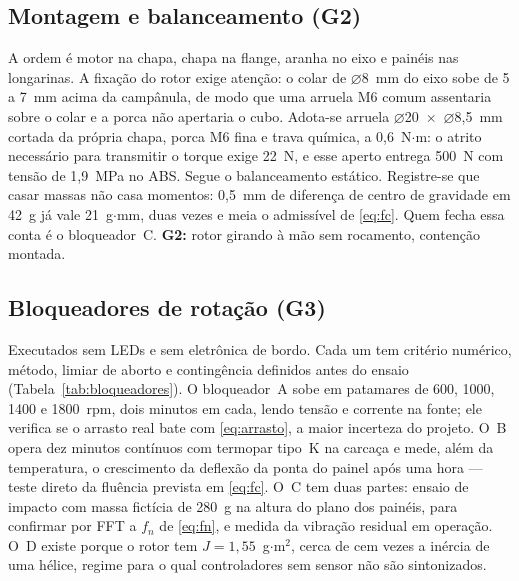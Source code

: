 \documentclass[10pt,a4paper,twocolumn]{article}
\begin{document}
\subsection{Montagem e balanceamento (G2)}

A ordem é motor na chapa, chapa na flange, aranha no eixo e painéis nas
longarinas. A fixação do rotor exige atenção: o colar de $\varnothing$8~mm do
eixo sobe de 5 a 7~mm acima da campânula, de modo que uma arruela M6 comum
assentaria sobre o colar e a porca não apertaria o cubo. Adota-se arruela
$\varnothing$20~$\times$~$\varnothing$8,5~mm cortada da própria chapa, porca M6
fina e trava química, a 0,6~N$\cdot$m: o atrito necessário para transmitir o
torque exige 22~N, e esse aperto entrega 500~N com tensão de 1,9~MPa no ABS.
Segue o balanceamento estático. Registre-se que casar massas não casa momentos:
0,5~mm de diferença de centro de gravidade em 42~g já vale 21~g$\cdot$mm, duas
vezes e meia o admissível de \eqref{eq:fc}. Quem fecha essa conta é o
bloqueador~C. \textbf{G2:} rotor girando à mão sem rocamento, contenção
montada.

\subsection{Bloqueadores de rotação (G3)}

Executados sem LEDs e sem eletrônica de bordo. Cada um tem critério numérico,
método, limiar de aborto e contingência definidos antes do ensaio
(Tabela~\ref{tab:bloqueadores}). O bloqueador~A sobe em patamares de 600, 1000,
1400 e 1800~rpm, dois minutos em cada, lendo tensão e corrente na fonte; ele
verifica se o arrasto real bate com \eqref{eq:arrasto}, a maior incerteza do
projeto. O~B opera dez minutos contínuos com termopar tipo~K na carcaça e mede,
além da temperatura, o crescimento da deflexão da ponta do painel após uma hora
--- teste direto da fluência prevista em \eqref{eq:fc}. O~C tem duas partes:
ensaio de impacto com massa fictícia de 280~g na altura do plano dos painéis,
para confirmar por FFT a $f_n$ de \eqref{eq:fn}, e medida da vibração residual
em operação. O~D existe porque o rotor tem $J = 1{,}55$~g$\cdot$m$^2$, cerca de
cem vezes a inércia de uma hélice, regime para o qual controladores sem sensor
não são sintonizados.
\end{document}
